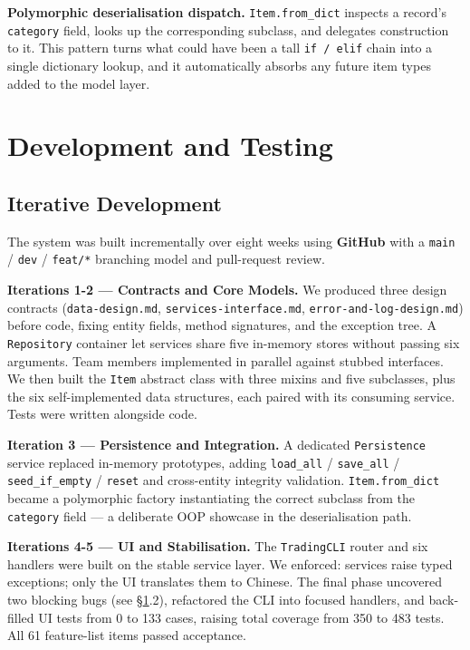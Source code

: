\documentclass[11pt,a4paper]{article}
\begin{document}
\textbf{Polymorphic deserialisation dispatch.} \texttt{Item.from\_dict} inspects a record's \texttt{category} field, looks up the corresponding subclass, and delegates construction to it. This pattern turns what could have been a tall \texttt{if / elif} chain into a single dictionary lookup, and it automatically absorbs any future item types added to the model layer.

\vspace{1\baselineskip}
\section{Development and Testing}
\label{sec:dev_testing}

\subsection{Iterative Development}

The system was built incrementally over eight weeks using \textbf{GitHub} with a \texttt{main} / \texttt{dev} / \texttt{feat/*} branching model and pull-request review.

\textbf{Iterations 1-2 — Contracts and Core Models.}
We produced three design contracts (\texttt{data-design.md}, \texttt{services-interface.md}, \texttt{error-and-log-design.md}) before code, fixing entity fields, method signatures, and the exception tree. A \texttt{Repository} container let services share five in-memory stores without passing six arguments. Team members implemented in parallel against stubbed interfaces. We then built the \texttt{Item} abstract class with three mixins and five subclasses, plus the six self-implemented data structures, each paired with its consuming service. Tests were written alongside code.

\textbf{Iteration 3 — Persistence and Integration.}
A dedicated \texttt{Persistence} service replaced in-memory prototypes, adding \texttt{load\_all} / \texttt{save\_all} / \texttt{seed\_if\_empty} / \texttt{reset} and cross-entity integrity validation. \texttt{Item.from\_dict} became a polymorphic factory instantiating the correct subclass from the \texttt{category} field — a deliberate OOP showcase in the deserialisation path.

\textbf{Iterations 4-5 — UI and Stabilisation.}
The \texttt{TradingCLI} router and six handlers were built on the stable service layer. We enforced: services raise typed exceptions; only the UI translates them to Chinese. The final phase uncovered two blocking bugs (see §\ref{sec:dev_testing}.2), refactored the CLI into focused handlers, and back-filled UI tests from 0 to 133 cases, raising total coverage from 350 to 483 tests. All 61 feature-list items passed acceptance.
\end{document}

